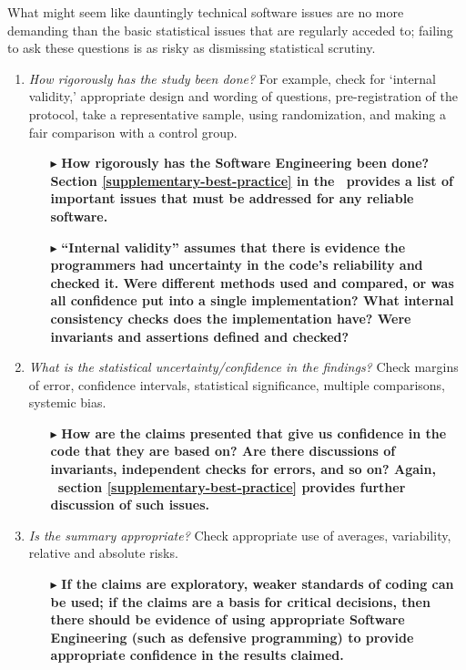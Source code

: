 \documentclass[10pt,a4paper]{article}
\begin{document}
What might seem like dauntingly technical software issues are no more demanding than the basic statistical issues that are regularly acceded to; failing to ask these questions is as risky as dismissing statistical scrutiny.

\def\questionsection#1{\changemysubsection{#1}}
\def\question#1{\item \emph{#1\/}}
\def\sequestion#1{\begin{itemize}\raggedright\item[$\blacktriangleright$] \textbf{#1}\end{itemize}}

\questionsection{How trustworthy are the numbers?}

\begin{enumerate}
\question{How rigorously has the study been done?} For example, check for `internal validity,' appropriate design and wording of questions, pre-registration of the protocol, take a representative sample, using randomization, and making a fair comparison with a control group.

\sequestion{How rigorously has the Software Engineering been done? Section \ref{supplementary-best-practice} in the \supplement\ provides a list of important issues that must be addressed for any reliable software.}

\sequestion{``Internal validity'' assumes that there is evidence the programmers had uncertainty in the code's reliability and checked it. Were different methods used and compared, or was all confidence put into a single implementation? What internal consistency checks does the implementation have? Were invariants and assertions defined and checked? }

\question{What is the statistical uncertainty/confidence in the findings?} Check margins of error, confidence intervals, statistical significance, multiple comparisons, systemic bias.

\sequestion{How are the claims presented that give us confidence in the code that they are based on? Are there discussions of invariants, independent checks for errors, and so on? Again, \supplement\ section \ref{supplementary-best-practice} provides further discussion of such issues.}

\question{Is the summary appropriate?} Check appropriate use of averages, variability, relative and absolute risks.

\sequestion{If the claims are exploratory, weaker standards of coding can be used; if the claims are a basis for critical decisions, then there should be evidence of using appropriate Software Engineering (such as defensive programming) to provide appropriate confidence in the results claimed.}
\setcounter{resumeCounter}{\value{enumi}}
\end{enumerate}
\end{document}
